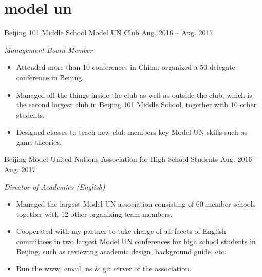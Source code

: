 \documentclass[]{adamyi-cv} %
\begin{document}

\section{model un}

\begin{entrylist}


\entry
{Beijing 101 Middle School Model UN Club}
{Aug. 2016 -- Aug. 2017}
{\emph{Management Board Member}
\begin{itemize}
\item Attended more than 10 conferences in China; organized a 50-delegate conference in Beijing.
\item Managed all the things inside the club as well as outside the club, which is the second largest club in Beijing 101 Middle School, together with 10 other students.
\item Designed classes to teach new club members key Model UN skills such as game theories.
\end{itemize}}


\entry
{Beijing Model United Nations Association for High School Students}
{Aug. 2016 -- Aug. 2017}
{\emph{Director of Academics (English)}
\begin{itemize}
\item Managed the largest Model UN association consisting of 60 member schools together with 12 other organizing team members.
\item Cooperated with my partner to take charge of all facets of English committees in two largest Model UN conferences for high school students in Beijing, such as reviewing academic design, background guide, etc.
\item Run the www, email, ns \& git server of the association.
\end{itemize}}


\end{entrylist}

\pagebreak


\end{document}
